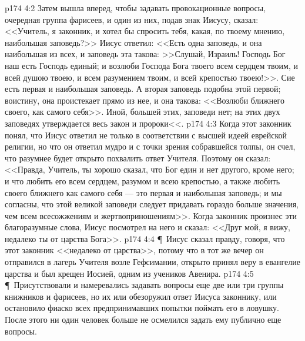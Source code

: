 \vs p174 4:2 Затем вышла вперед, чтобы задавать провокационные вопросы, очередная группа фарисеев, и один из них, подав знак Иисусу, сказал: <<Учитель, я законник, и хотел бы спросить тебя, какая, по твоему мнению, наибольшая заповедь?>> Иисус ответил: <<Есть одна заповедь, и она наибольшая из всех, и заповедь эта такова: >>Слушай, Израиль! Господь Бог наш есть Господь единый; и возлюби Господа Бога твоего всем сердцем твоим, и всей душою твоею, и всем разумением твоим, и всей крепостью твоею!>>. Сие есть первая и наибольшая заповедь. А вторая заповедь подобна этой первой; воистину, она проистекает прямо из нее, и она такова: <<Возлюби ближнего своего, как самого себя>>. Иной, большей этих, заповеди нет; на этих двух заповедях утверждается весь закон и пророки<<.
\vs p174 4:3 Когда этот законник понял, что Иисус ответил не только в соответствии с высшей идеей еврейской религии, но что он ответил мудро и с точки зрения собравшейся толпы, он счел, что разумнее будет открыто похвалить ответ Учителя. Поэтому он сказал: <<Правда, Учитель, ты хорошо сказал, что Бог един и нет другого, кроме него; и что любить его всем сердцем, разумом и всею крепостью, а также любить своего ближнего как самого себя --- это первая и наибольшая заповедь; и мы согласны, что этой великой заповеди следует придавать гораздо больше значения, чем всем всесожжениям и жертвоприношениям>>. Когда законник произнес эти благоразумные слова, Иисус посмотрел на него и сказал: <<Друг мой, я вижу, недалеко ты от царства Бога>>.
\vs p174 4:4 \P\ Иисус сказал правду, говоря, что этот законник <<недалеко от царства>>, потому что в тот же вечер он отправился в лагерь Учителя возле Гефсимании, открыто принял веру в евангелие царства и был крещен Иосией, одним из учеников Авенира.
\vs p174 4:5 \P\ Присутствовали и намеревались задавать вопросы еще две или три группы книжников и фарисеев, но их или обезоружил ответ Иисуса законнику, или остановило фиаско всех предпринимавших попытки поймать его в ловушку. После этого ни один человек больше не осмелился задать ему публично еще вопросы.

